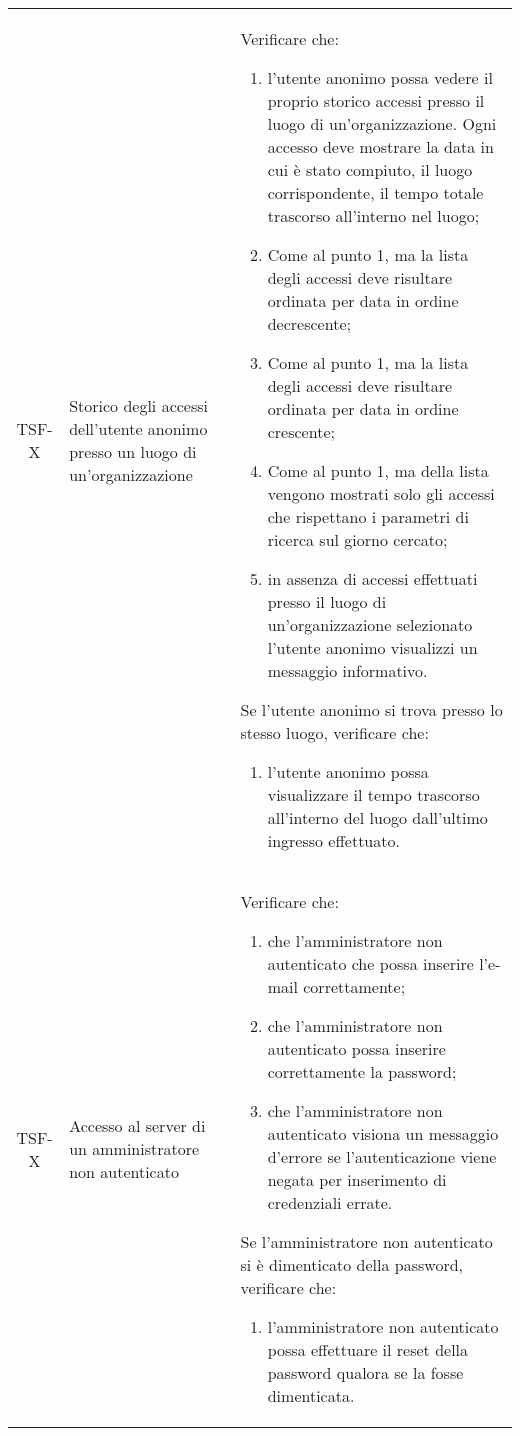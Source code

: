 {\begin{longtable}{ c | C{3cm} | C{11cm} }
TSF-X & Storico degli accessi dell'utente anonimo presso un luogo di un'organizzazione & 
Verificare che:    
\begin{enumerate}
    \item l'utente anonimo possa vedere il proprio storico accessi presso il luogo di un'organizzazione. Ogni accesso deve mostrare la data in cui è stato compiuto, il luogo corrispondente, il tempo totale trascorso all'interno nel luogo;
    \item Come al punto 1, ma la lista degli accessi deve risultare ordinata per data in ordine decrescente;
    \item Come al punto 1, ma la lista degli accessi deve risultare ordinata per data in ordine crescente;
    \item Come al punto 1, ma della lista vengono mostrati solo gli accessi che rispettano i parametri di ricerca sul giorno cercato;
    \item in assenza di accessi effettuati presso il luogo di un'organizzazione selezionato l'utente anonimo visualizzi un messaggio informativo.
\end{enumerate}
Se l'utente anonimo si trova presso lo stesso luogo, verificare che:
\begin{enumerate}
    \item l'utente anonimo possa visualizzare il tempo trascorso all'interno del luogo dall'ultimo ingresso effettuato.
\end{enumerate} \\

TSF-X & Accesso al server di un amministratore non autenticato & 
Verificare che:
\begin{enumerate}
    \item che l'amministratore non autenticato che  possa inserire l'e-mail correttamente;
    \item che l'amministratore non autenticato possa inserire correttamente la password;
    \item che l'amministratore non autenticato visiona un messaggio d'errore se l'autenticazione viene negata per inserimento di credenziali errate.
\end{enumerate}
Se l'amministratore non autenticato si è dimenticato della password, verificare che:
\begin{enumerate}
    \item l'amministratore non autenticato possa effettuare il reset della password qualora se la fosse dimenticata.
\end{enumerate} \\


\end{longtable}}
